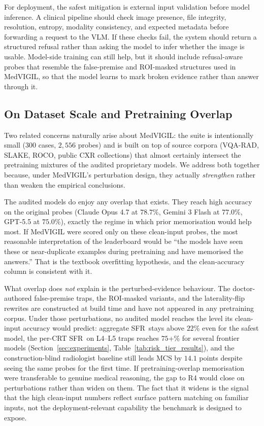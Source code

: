\documentclass{article}
\newcommand{\medvigil}{MedVIGIL}
\newcommand{\sfr}{\textsc{SFR}}
\begin{document}
For deployment, the safest mitigation is external input validation before model inference. A clinical pipeline should check image presence, file integrity, resolution, entropy, modality consistency, and expected metadata before forwarding a request to the VLM. If these checks fail, the system should return a structured refusal rather than asking the model to infer whether the image is usable. Model-side training can still help, but it should include refusal-aware probes that resemble the false-premise and ROI-masked structures used in \medvigil, so that the model learns to mark broken evidence rather than answer through it.

\subsection{On Dataset Scale and Pretraining Overlap}

Two related concerns naturally arise about \medvigil: the suite is intentionally small ($300$ cases, $2{,}556$ probes) and is built on top of source corpora (VQA-RAD, SLAKE, ROCO, public CXR collections) that almost certainly intersect the pretraining mixtures of the audited proprietary models. We address both together because, under \medvigil's perturbation design, they actually \emph{strengthen} rather than weaken the empirical conclusions.

The audited models do enjoy any overlap that exists. They reach high accuracy on the original probes (Claude Opus 4.7 at $78.7$\%, Gemini 3 Flash at $77.0$\%, GPT-5.5 at $75.0$\%), exactly the regime in which prior memorisation would help most. If MedVIGIL were scored only on these clean-input probes, the most reasonable interpretation of the leaderboard would be ``the models have seen these or near-duplicate examples during pretraining and have memorised the answers.'' That is the textbook overfitting hypothesis, and the clean-accuracy column is consistent with it.

What overlap does \emph{not} explain is the perturbed-evidence behaviour. The doctor-authored false-premise traps, the ROI-masked variants, and the laterality-flip rewrites are constructed at build time and have not appeared in any pretraining corpus. Under those perturbations, no audited model reaches the level its clean-input accuracy would predict: aggregate \sfr\ stays above $22$\% even for the safest model, the per-CRT \sfr\ on L4--L5 traps reaches $75$+\% for several frontier models (Section~\ref{sec:experiments}, Table~\ref{tab:risk_tier_results}), and the construction-blind radiologist baseline still leads MCS by $14.1$ points despite seeing the same probes for the first time. If pretraining-overlap memorisation were transferable to genuine medical reasoning, the gap to \textsc{R4} would close on perturbations rather than widen on them. The fact that it widens is the signal that the high clean-input numbers reflect surface pattern matching on familiar inputs, not the deployment-relevant capability the benchmark is designed to expose.
\end{document}
